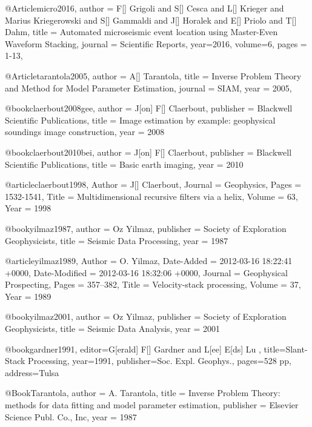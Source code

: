 @Article{micro2016,
  author =	 {F[] Grigoli and S[] Cesca and L[] Krieger and Marius Kriegerowski and S[] Gammaldi and J[] Horalek and E[] Priolo and T[] Dahm},
  title =	 {Automated microseismic event location using Master-Even Waveform Stacking},
  journal =	 {Scientific Reports},
  year=2016,
  volume=6,
  pages =	 {1-13},
}





@Article{tarantola2005,
  author = 	 {A[] Tarantola},
  title = 	 {Inverse Problem Theory and Method for Model Parameter Estimation},
  journal = 	 {SIAM},
  year = 	 2005,
}







@book{claerbout2008gee,
   author = {J[on] F[] Claerbout},
   publisher = {Blackwell Scientific Publications},
   title = {Image estimation by example: geophysical soundings image construction},
   year = {2008}
}

@book{claerbout2010bei,
   author = {J[on] F[] Claerbout},
   publisher = {Blackwell Scientific Publications},
   title = {Basic earth imaging},
   year = {2010}
}

@article{claerbout1998,
	Author = {J[] Claerbout},
	Journal = {Geophysics},
	Pages = {1532-1541},
	Title = {Multidimensional recursive filters via a helix},
	Volume = {63},
	Year = {1998}}

@book{yilmaz1987,
   author = {Oz Yilmaz},
   publisher = {Society of Exploration Geophysicists},
   title = {Seismic Data Processing},
   year = {1987}
}

@article{yilmaz1989,
	Author = {O. Yilmaz},
	Date-Added = {2012-03-16 18:22:41 +0000},
	Date-Modified = {2012-03-16 18:32:06 +0000},
	Journal = {Geophysical Prospecting},
	Pages = {357--382},
	Title = {Velocity-stack processing},
	Volume = {37},
	Year = {1989}}

@book{yilmaz2001,
   author = {Oz Yilmaz},
   publisher = {Society of Exploration Geophysicists},
   title = {Seismic Data Analysis},
   year = {2001}
}

@book{gardner1991,
  editor={G[erald] F[]  Gardner  and L[ee] E[ds]  Lu },
  title={Slant-Stack Processing},
  year=1991,
  publisher={Soc. Expl. Geophys.},
  pages={528 pp},
  address={Tulsa}
}



@Book{Tarantola,
  author = 	 {A. Tarantola},
  title = 	 {Inverse {P}roblem {T}heory: methods for data
                 fitting and model parameter estimation},
  publisher = 	 {Elsevier Science Publ. Co., Inc},
  year = 	 1987
}

